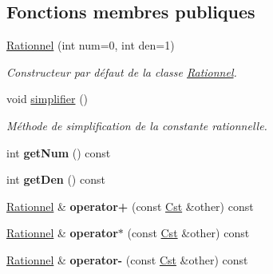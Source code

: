 \subsection*{Fonctions membres publiques}
\begin{DoxyCompactItemize}
\item 
\hyperlink{classcalcul_1_1_rationnel_a56a577ec24723185aa6c133b1f3e6021}{Rationnel} (int num=0, int den=1)
\begin{DoxyCompactList}\small\item\em Constructeur par défaut de la classe \hyperlink{classcalcul_1_1_rationnel}{Rationnel}. \end{DoxyCompactList}\item 
\hypertarget{classcalcul_1_1_rationnel_a12ee060e5fca5f4291b222983d727268}{void \hyperlink{classcalcul_1_1_rationnel_a12ee060e5fca5f4291b222983d727268}{simplifier} ()}\label{classcalcul_1_1_rationnel_a12ee060e5fca5f4291b222983d727268}

\begin{DoxyCompactList}\small\item\em Méthode de simplification de la constante rationnelle. \end{DoxyCompactList}\item 
\hypertarget{classcalcul_1_1_rationnel_ac9596f5d24cef6120c0cabcd7923aa29}{int {\bfseries get\-Num} () const }\label{classcalcul_1_1_rationnel_ac9596f5d24cef6120c0cabcd7923aa29}

\item 
\hypertarget{classcalcul_1_1_rationnel_a6162bd26152763675e2fd1cf8fef792a}{int {\bfseries get\-Den} () const }\label{classcalcul_1_1_rationnel_a6162bd26152763675e2fd1cf8fef792a}

\item 
\hypertarget{classcalcul_1_1_rationnel_af9915c3a9b750c89533673b74f490f58}{\hyperlink{classcalcul_1_1_rationnel}{Rationnel} \& {\bfseries operator+} (const \hyperlink{classcalcul_1_1_cst}{Cst} \&other) const }\label{classcalcul_1_1_rationnel_af9915c3a9b750c89533673b74f490f58}

\item 
\hypertarget{classcalcul_1_1_rationnel_a0f4ab960d4323edbd7b91ab1e01f7f06}{\hyperlink{classcalcul_1_1_rationnel}{Rationnel} \& {\bfseries operator$\ast$} (const \hyperlink{classcalcul_1_1_cst}{Cst} \&other) const }\label{classcalcul_1_1_rationnel_a0f4ab960d4323edbd7b91ab1e01f7f06}

\item 
\hypertarget{classcalcul_1_1_rationnel_a33fea126a3f9dd73765e34e73c2ad5ad}{\hyperlink{classcalcul_1_1_rationnel}{Rationnel} \& {\bfseries operator-\/} (const \hyperlink{classcalcul_1_1_cst}{Cst} \&other) const }\label{classcalcul_1_1_rationnel_a33fea126a3f9dd73765e34e73c2ad5ad}


\end{DoxyCompactItemize}
